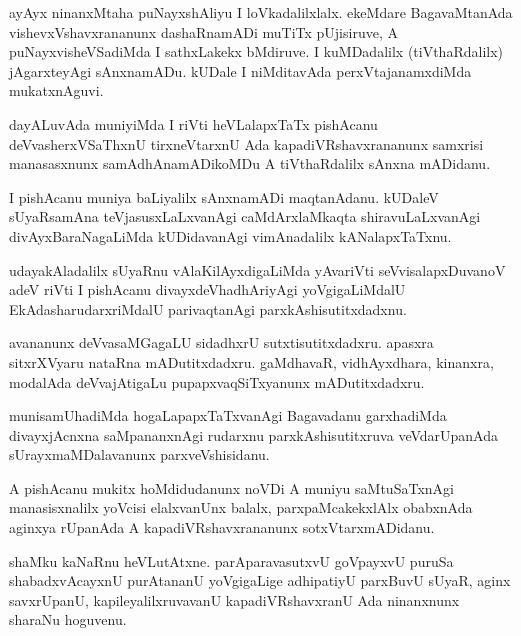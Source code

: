 \documentclass{article}
\begin{document}
\begin{mn}
ayAyx ninanxMtaha puNayxshAliyu I loVkadalilxlalx. ekeMdare BagavaMtanAda vishevxVshavxrananunx 
dashaRnamADi muTiTx pUjisiruve, A puNayxvisheVSadiMda I sathxLakekx bMdiruve. I  kuMDadalilx 
(tiVthaRdalilx) jAgarxteyAgi sAnxnamADu. kUDale I niMditavAda perxVtajanamxdiMda mukatxnAguvi.
\end{mn}

\begin{mn}
dayALuvAda muniyiMda I riVti heVLalapxTaTx pishAcanu deVvasherxVSaThxnU tirxneVtarxnU Ada 
kapadiVRshavxrananunx samxrisi manasasxnunx samAdhAnamADikoMDu A tiVthaRdalilx sAnxna mADidanu.
\end{mn}

\begin{mn}
I pishAcanu muniya baLiyalilx sAnxnamADi maqtanAdanu. kUDaleV sUyaRsamAna teVjasusxLaLxvanAgi 
caMdArxlaMkaqta shiravuLaLxvanAgi divAyxBaraNagaLiMda kUDidavanAgi vimAnadalilx kANalapxTaTxnu.
\end{mn}

\begin{mn}
udayakAladalilx sUyaRnu vAlaKilAyxdigaLiMda yAvariVti seVvisalapxDuvanoV adeV riVti I pishAcanu 
divayxdeVhadhAriyAgi yoVgigaLiMdalU EkAdasharudarxriMdalU parivaqtanAgi parxkAshisutitxdadxnu.
\end{mn}

\begin{mn}
avananunx deVvasaMGagaLU sidadhxrU sutxtisutitxdadxru. apasxra sitxrXVyaru nataRna mADutitxdadxru.
gaMdhavaR, vidhAyxdhara, kinanxra, modalAda deVvajAtigaLu pupapxvaqSiTxyanunx mADutitxdadxru.
\end{mn}

\begin{mn}
munisamUhadiMda hogaLapapxTaTxvanAgi Bagavadanu garxhadiMda divayxjAcnxna saMpananxnAgi rudarxnu 
parxkAshisutitxruva veVdarUpanAda sUrayxmaMDalavanunx parxveVshisidanu.
\end{mn}

\begin{mn}
A pishAcanu mukitx hoMdidudanunx noVDi A muniyu saMtuSaTxnAgi manasisxnalilx yoVcisi elalxvanUnx 
balalx, parxpaMcakekxlAlx obabxnAda aginxya rUpanAda  A kapadiVRshavxrananunx sotxVtarxmADidanu.
\end{mn}

\begin{mn}
shaMku kaNaRnu heVLutAtxne. parAparavasutxvU goVpayxvU puruSa shabadxvAcayxnU purAtananU 
yoVgigaLige adhipatiyU parxBuvU sUyaR, aginx savxrUpanU, kapileyalilxruvavanU kapadiVRshavxranU 
Ada ninanxnunx sharaNu hoguvenu.
\end{mn}
\end{document}
